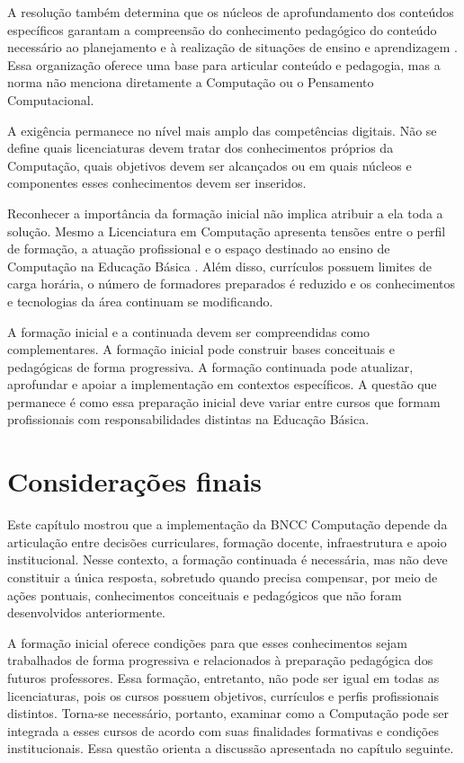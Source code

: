 A resolução também determina que os núcleos de aprofundamento dos conteúdos específicos garantam a compreensão do conhecimento pedagógico do conteúdo necessário ao planejamento e à realização de situações de ensino e aprendizagem \cite{brasil2024resolucao4}. Essa organização oferece uma base para articular conteúdo e pedagogia, mas a norma não menciona diretamente a Computação ou o Pensamento Computacional.

A exigência permanece no nível mais amplo das competências digitais. Não se define quais licenciaturas devem tratar dos conhecimentos próprios da Computação, quais objetivos devem ser alcançados ou em quais núcleos e componentes esses conhecimentos devem ser inseridos.

Reconhecer a importância da formação inicial não implica atribuir a ela toda a solução. Mesmo a Licenciatura em Computação apresenta tensões entre o perfil de formação, a atuação profissional e o espaço destinado ao ensino de Computação na Educação Básica \cite{gentil2013licenciatura}. Além disso, currículos possuem limites de carga horária, o número de formadores preparados é reduzido e os conhecimentos e tecnologias da área continuam se modificando.

A formação inicial e a continuada devem ser compreendidas como complementares. A formação inicial pode construir bases conceituais e pedagógicas de forma progressiva. A formação continuada pode atualizar, aprofundar e apoiar a implementação em contextos específicos. A questão que permanece é como essa preparação inicial deve variar entre cursos que formam profissionais com responsabilidades distintas na Educação Básica.

\section{Considerações finais}
\label{sec:consideracoes-finais-referencial}

Este capítulo mostrou que a implementação da BNCC Computação depende da articulação entre decisões curriculares, formação docente, infraestrutura e apoio institucional. Nesse contexto, a formação continuada é necessária, mas não deve constituir a única resposta, sobretudo quando precisa compensar, por meio de ações pontuais, conhecimentos conceituais e pedagógicos que não foram desenvolvidos anteriormente.

A formação inicial oferece condições para que esses conhecimentos sejam trabalhados de forma progressiva e relacionados à preparação pedagógica dos futuros professores. Essa formação, entretanto, não pode ser igual em todas as licenciaturas, pois os cursos possuem objetivos, currículos e perfis profissionais distintos. Torna-se necessário, portanto, examinar como a Computação pode ser integrada a esses cursos de acordo com suas finalidades formativas e condições institucionais. Essa questão orienta a discussão apresentada no capítulo seguinte.